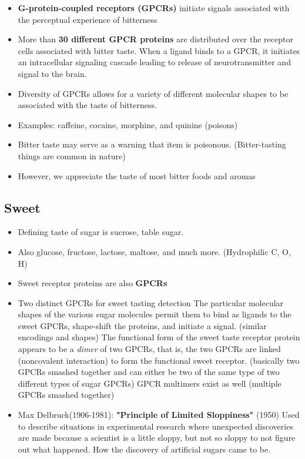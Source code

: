 \documentclass{article}
\begin{document}
\begin{itemize}
    \item \textbf{G-protein-coupled receptors (GPCRs)} initiate signals associated with the perceptual experience of bitterness 
    \item More than \textbf{30 different GPCR proteins} are distributed over the receptor cells associated with bitter taste. When a ligand binds to a GPCR, it initiates an intracellular signaling cascade leading to release of neurotransmitter and signal to the brain. 
    \item Diversity of GPCRs allows for a variety of different molecular shapes to be associated with the taste of bitterness. 
    \item Examples: caffeine, cocaine, morphine, and quinine (poisons) 
    \item Bitter taste may serve as a warning that item is poisonous. (Bitter-tasting things are common in nature) 
    \item However, we appreciate the taste of most bitter foods and aromas
\end{itemize}

\subsection{Sweet}

\begin{itemize}
    \item Defining taste of sugar is sucrose, table sugar. 
    \item Also glucose, fructose, lactose, maltose, and much more. (Hydrophilic C, O, H)
    \item Sweet receptor proteins are also \textbf{GPCRs} 
    \item Two distinct GPCRs for sweet tasting detection 
        \subitem The particular molecular shapes of the various sugar molecules permit them to bind as ligands to the sweet GPCRs, shape-shift the proteins, and initiate a signal. (similar encodings and shapes) 
        \subitem The functional form of the sweet taste receptor protein appears to be a \textit{dimer} of two GPCRs, that is, the two GPCRs are linked (noncovalent interaction) to form the functional sweet receptor. (basically two GPCRs smashed together and can either be two of the same type of two different types of sugar GPCRs) 
        \subitem GPCR multimers exist as well (multiple GPCRs smashed together) 
    \item Max Delbruck(1906-1981):  \textbf{"Principle of Limited Sloppiness"} (1950)
        \subitem Used to describe situations in experimental research where unexpected discoveries are made because a scientist is a little sloppy, but not so sloppy to not figure out what happened. 
        \subitem How the discovery of artificial sugars came to be. 
\end{itemize}
\end{document}
